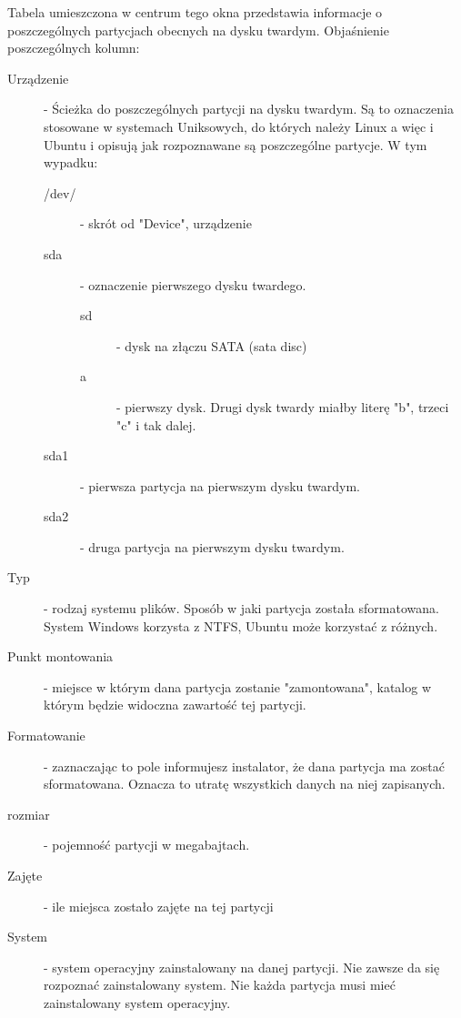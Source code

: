 Tabela umieszczona w centrum tego okna przedstawia informacje o poszczególnych partycjach obecnych na dysku twardym. Objaśnienie poszczególnych kolumn:
\begin{description}
\item[Urządzenie] - Ścieżka do poszczególnych partycji na dysku twardym. Są to oznaczenia stosowane w systemach Uniksowych, do których należy Linux a więc i Ubuntu i opisują jak rozpoznawane są poszczególne partycje. W tym wypadku:
        \begin{description}
        \item[/dev/] - skrót od "Device", urządzenie
        \item[sda] - oznaczenie pierwszego dysku twardego.
                \begin{description}
                        \item[sd] - dysk na złączu SATA (sata disc)
                        \item[a] - pierwszy dysk. Drugi dysk twardy miałby literę "b", trzeci "c" i tak dalej.
                \end{description}
        \item[sda1] - pierwsza partycja na pierwszym dysku twardym.
        \item[sda2] - druga partycja na pierwszym dysku twardym.
        \end{description}
\item[Typ] - rodzaj systemu plików. Sposób w jaki partycja została sformatowana. System Windows korzysta z NTFS, Ubuntu może korzystać z różnych.
\item[Punkt montowania] - miejsce w którym dana partycja zostanie "zamontowana", katalog w którym będzie widoczna zawartość tej partycji.
\item[Formatowanie] - zaznaczając to pole informujesz instalator, że dana partycja ma zostać sformatowana. Oznacza to utratę wszystkich danych na niej zapisanych.
\item[rozmiar] - pojemność partycji w megabajtach.
\item[Zajęte] - ile miejsca zostało zajęte na tej partycji
\item[System] - system operacyjny zainstalowany na danej partycji. Nie zawsze da się rozpoznać zainstalowany system. Nie każda partycja musi mieć zainstalowany system operacyjny. 
\end{description}
\clearpage
